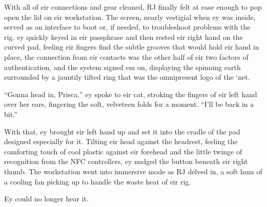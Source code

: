 With all of eir connections and gear cleaned, RJ finally felt at ease enough to pop open the lid on eir workstation. The screen, nearly vestigial when ey was inside, served as an interface to boot or, if needed, to troubleshoot problems with the rig. ey quickly keyed in eir passphrase and then rested eir right hand on the curved pad, feeling eir fingers find the subtle grooves that would hold eir hand in place, the connection from eir contacts was the other half of eir two factors of authentication, and the system signed em on, displaying the spinning earth surrounded by a jauntily tilted ring that was the omnipresent logo of the `net.

``Gonna head in, Prisca,'' ey spoke to eir cat, stroking the fingers of eir left hand over her ears, fingering the soft, velveteen folds for a moment. ``I'll be back in a bit.''

With that, ey brought eir left hand up and set it into the cradle of the pad designed especially for it. Tilting eir head against the headrest, feeling the comforting touch of cool plastic against eir forehead and the little twinge of recognition from the NFC controllers, ey nudged the button beneath eir right thumb. The workstation went into immersive mode as RJ delved in, a soft hum of a cooling fan picking up to handle the waste heat of eir rig.

Ey could no longer hear it.
